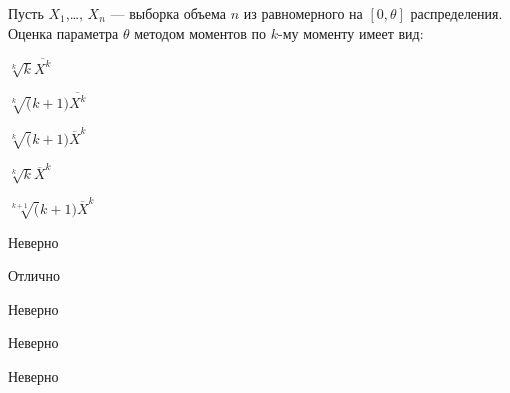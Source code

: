 
\begin{question}
Пусть \(X_1\),\ldots, \(X_n\) --- выборка объема \(n\) из равномерного
на \([0, \theta]\) распределения. Оценка параметра \(\theta\) методом
моментов по \(k\)-му моменту имеет вид:
\begin{answerlist}
  \item \(\sqrt[k]k \overline{X^k}\)
  \item \(\sqrt[k](k+1) \overline{X^k}\)
  \item \(\sqrt[k](k+1) \overline{X}^k\)
  \item \(\sqrt[k]k \overline{X}^k\)
  \item \(\sqrt[k+1](k+1) \overline{X}^k\)
\end{answerlist}
\end{question}

\begin{solution}
\begin{answerlist}
  \item Неверно
  \item Отлично
  \item Неверно
  \item Неверно
  \item Неверно
\end{answerlist}
\end{solution}

